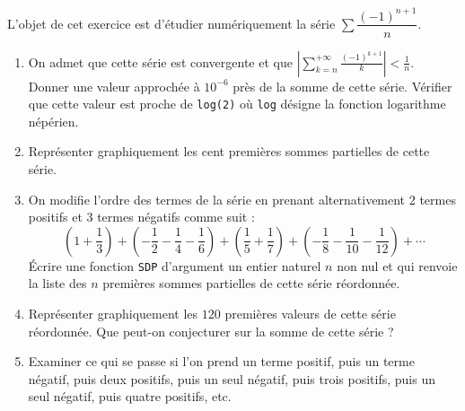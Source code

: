 \begin{exercice}
L'objet de cet exercice est d'étudier numériquement la série $\sum \dfrac{(-1)^{n+1}}{n}$.
\begin{enumerate}
\item On admet que cette série est convergente et que $\left| \sum\limits_{k=n}^{+\infty}\frac{(-1)^{k+1}}{k}\right|<\frac{1}{n}$. \\
Donner une valeur approchée à $10^{-6}$ près de la somme de cette série. Vérifier que cette valeur est proche de \texttt{log(2)} où \texttt{log} désigne la fonction logarithme népérien. 
\item Représenter graphiquement les cent premières sommes partielles de cette série.
\item On modifie l'ordre des termes de la série en prenant alternativement $2$ termes positifs et $3$ termes négatifs comme suit :
$$\left(1+\frac{1}{3}\right)+\left(-\frac{1}{2}-\frac{1}{4}-\frac{1}{6}\right)+\left(\frac{1}{5}+\frac{1}{7}\right)+\left(-\frac{1}{8}-\frac{1}{10}-\frac{1}{12}\right)+\cdots$$
\'Ecrire une fonction \texttt{SDP} d'argument un entier naturel $n$ non nul et qui renvoie la liste des $n$ premières sommes partielles de cette série réordonnée.
\item Représenter graphiquement les $120$ premières valeurs de cette série réordonnée. Que peut-on conjecturer sur la somme de cette série ?
\item Examiner ce qui se passe si l'on prend un terme positif, puis un terme négatif, puis deux positifs, puis un seul négatif, puis trois positifs, puis un seul négatif, puis quatre positifs, etc.
\end{enumerate}
\end{exercice}




